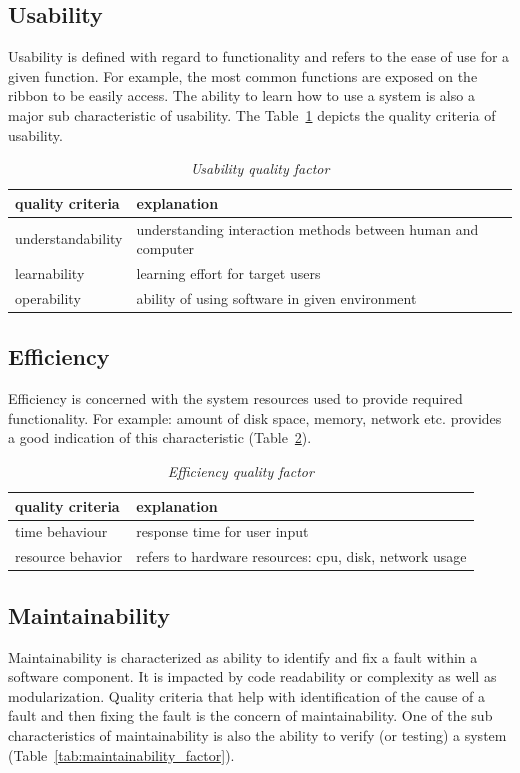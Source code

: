 \subsection{Usability}
Usability is defined with regard to functionality and refers to the ease of use for a given function. For example, the most common functions are exposed on the ribbon to be easily access. The ability to learn how to use a system is also a major sub characteristic of usability. The Table~\ref{tab:usability_factor} depicts the quality criteria of usability.

\begin{table}[h!]
	\centering
\begin{tabular}{|l|l|}
\hline
{\bf quality criteria} & {\bf explanation} \\
\hline
understandability & understanding interaction methods between human and computer \\
\hline
learnability & learning effort for target users \\
\hline
operability & ability of using software in given environment \\
\hline
\end{tabular}	
	\caption{\textit{Usability quality factor}}
	\label{tab:usability_factor}
\end{table}


\subsection{Efficiency}
Efficiency  is concerned with the system resources used to provide required functionality. For example: amount of disk space, memory, network etc. provides a good indication of this characteristic (Table~\ref{tab:efficiency_factor}).

\begin{table}[h!]
	\centering
\begin{tabular}{|l|l|}
\hline
{\bf quality criteria} & {\bf explanation} \\
\hline
time behaviour & response time for user input \\
\hline
resource behavior & refers to hardware resources: cpu, disk, network usage \\
\hline
\end{tabular}	
	\caption{\textit{Efficiency quality factor}}
	\label{tab:efficiency_factor}
\end{table} 


\subsection{Maintainability}
Maintainability is characterized as ability to identify and fix a fault within a software component. It is impacted by code readability or complexity as well as modularization. Quality criteria that help with identification of the cause of a fault and then fixing the fault is the concern of maintainability.  One of the sub characteristics of maintainability is also the ability to verify (or testing) a system (Table~\ref{tab:maintainability_factor}). 

